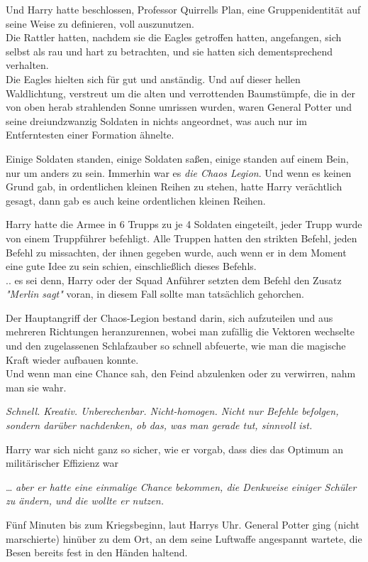 {Und Harry hatte beschlossen, Professor Quirrells Plan, eine Gruppenidentität auf seine Weise zu definieren, voll auszunutzen.\\ Die Rattler hatten, nachdem sie die Eagles getroffen hatten, angefangen, sich selbst als rau und hart zu betrachten, und sie hatten sich dementsprechend verhalten.\\ Die Eagles hielten sich für gut und anständig. Und auf dieser hellen Waldlichtung, verstreut um die alten und verrottenden Baumstümpfe, die in der von oben herab strahlenden Sonne umrissen wurden, waren General Potter und seine dreiundzwanzig Soldaten in nichts angeordnet, was auch nur im Entferntesten einer Formation ähnelte.

Einige Soldaten standen, einige Soldaten saßen, einige standen auf einem Bein, nur um anders zu sein. Immerhin war es \emph{die Chaos Legion}. Und wenn es keinen Grund gab, in ordentlichen kleinen Reihen zu stehen, hatte Harry verächtlich gesagt, dann gab es auch keine ordentlichen kleinen Reihen.

Harry hatte die Armee in 6 Trupps zu je 4 Soldaten eingeteilt, jeder Trupp wurde von einem Truppführer befehligt. Alle Truppen hatten den strikten Befehl, jeden Befehl zu missachten, der ihnen gegeben wurde, auch wenn er in dem Moment eine gute Idee zu sein schien, einschließlich dieses Befehls.\\ .. es sei denn, Harry oder der Squad Anführer setzten dem Befehl den Zusatz\\ \emph{"Merlin sagt"} voran, in diesem Fall sollte man tatsächlich gehorchen.

Der Hauptangriff der Chaos-Legion bestand darin, sich aufzuteilen und aus mehreren Richtungen heranzurennen, wobei man zufällig die Vektoren wechselte und den zugelassenen Schlafzauber so schnell abfeuerte, wie man die magische Kraft wieder aufbauen konnte.\\ Und wenn man eine Chance sah, den Feind abzulenken oder zu verwirren, nahm man sie wahr.

\emph{Schnell. Kreativ. Unberechenbar. Nicht-homogen. Nicht nur Befehle befolgen, sondern darüber nachdenken, ob das, was man gerade tut, sinnvoll ist.}

Harry war sich nicht ganz so sicher, wie er vorgab, dass dies das Optimum an militärischer Effizienz war

… \emph{aber er hatte eine einmalige Chance bekommen, die Denkweise einiger Schüler zu ändern, und die wollte er nutzen.}

Fünf Minuten bis zum Kriegsbeginn, laut Harrys Uhr. General Potter ging (nicht marschierte) hinüber zu dem Ort, an dem seine Luftwaffe angespannt wartete, die Besen bereits fest in den Händen haltend.

}
